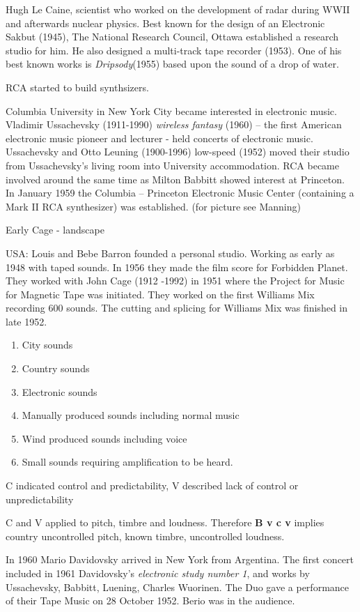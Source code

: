 Hugh Le Caine, scientist who worked on the development of radar during WWII and afterwards nuclear physics. Best known for the design of an Electronic Sakbut (1945), The National Research Council, Ottawa established a research studio for him. He also designed a multi-track tape recorder (1953). One of his best known works is \textit{Dripsody}(1955) based upon the sound of a drop of water.

RCA started to build synthsizers.

Columbia University in New York City became interested in electronic music. Vladimir Ussachevsky (1911-1990) \textit{wireless fantasy} (1960) – the first American electronic music pioneer and lecturer - held concerts of electronic music. Ussachevsky and Otto Leuning (1900-1996) low-speed (1952) moved their studio from Ussachevsky’s living room into University accommodation. RCA became involved around the same time as Milton Babbitt showed interest at Princeton. In January 1959 the Columbia – Princeton Electronic Music Center (containing a Mark II RCA synthesizer) was established. (for picture see Manning)

Early Cage - landscape

USA: Louis and Bebe Barron founded a personal studio. Working as early as 1948 with taped sounds. In 1956 they made the film score for Forbidden Planet. They worked with John Cage (1912 -1992) in 1951 where the Project for Music for Magnetic Tape was initiated. They worked on the first Williams Mix recording 600 sounds. The cutting and splicing for Williams Mix was finished in late 1952.
\begin{enumerate}[a]
\item City sounds
\item Country sounds
\item Electronic sounds
\item Manually produced sounds including normal music
\item Wind produced sounds including voice
\item Small sounds requiring amplification to be heard.
\end{enumerate}

C indicated control and predictability, V described lack of control or unpredictability

C and V applied to pitch, timbre and loudness. Therefore \textbf{B v c v} implies country uncontrolled pitch, known timbre, uncontrolled loudness.


In 1960 Mario Davidovsky arrived in New York from Argentina. The first concert included in 1961 Davidovsky's \textit{electronic study number 1}, and works by Ussachevsky, Babbitt, Luening, Charles Wuorinen. The Duo gave a performance of their Tape Music on 28 October 1952. Berio was in the audience.


